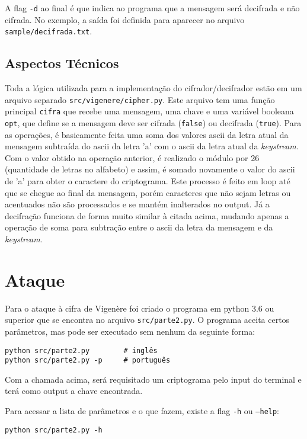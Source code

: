 \documentclass[12pt]{article}
\begin{document}
A flag \texttt{-d} ao final é que indica ao programa que a mensagem será decifrada e não cifrada. No exemplo, a saída foi definida para aparecer no arquivo \texttt{sample/decifrada.txt}.

\subsection{Aspectos Técnicos}
Toda a lógica utilizada para a implementação do cifrador/decifrador estão em um arquivo separado \texttt{src/vigenere/cipher.py}. Este arquivo tem uma função principal \texttt{cifra} que recebe uma mensagem, uma chave e uma variável booleana \texttt{opt}, que define se a mensagem deve ser cifrada (\texttt{false}) ou decifrada (\texttt{true}). Para as operações, é basicamente feita uma soma dos valores ascii da letra atual da mensagem subtraída do ascii da letra 'a' com o ascii da letra atual da \textit{keystream}.
Com o valor obtido na operação anterior, é realizado o módulo por 26 (quantidade de letras no alfabeto) e assim, é somado novamente o valor do ascii de 'a' para obter o caractere do criptograma. Este processo é feito em loop até que se chegue ao final da mensagem, porém caracteres que não sejam letras ou acentuados não são processados e se mantém inalterados no output. Já a decifração funciona de forma muito similar à citada acima, mudando apenas a operação de soma para subtração entre o ascii da letra da mensagem e da \textit{keystream}.

\section{Ataque}
Para o ataque à cifra de Vigenère foi criado o programa em python 3.6 ou superior que se encontra no arquivo \texttt{src/parte2.py}. O programa aceita certos parâmetros, mas pode ser executado sem nenhum da seguinte forma:

\begin{lstlisting}
python src/parte2.py        # inglês
python src/parte2.py -p     # português
\end{lstlisting}

Com a chamada acima, será requisitado um criptograma pelo input do terminal e terá como output a chave encontrada.

Para acessar a lista de parâmetros e o que fazem, existe a flag \texttt{-h} ou \texttt{--help}:

\begin{lstlisting}
python src/parte2.py -h
\end{lstlisting}
\end{document}
